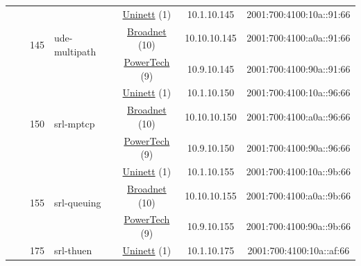 \begin{small}
\begin{center}
\begin{longtable}{|c|c|c|c|c|c|c|c|}
  &  & \multirow{3}{*}{\tiny{145}} & \multicolumn{1}{|l|}{\multirow{3}{*}{\tiny{ude-multipath}}} & \multicolumn{2}{|c|}{\tiny{\href{https://www.uninett.no}{Uninett} (1)}} & \tiny{10.1.10.145} & \tiny{2001:700:4100:10a::91:66} \\* \cline{5-5}\cline{6-6}\cline{7-7}\cline{8-8}
  &  &  &  & \multicolumn{2}{|c|}{\tiny{\href{https://www.broadnet.no}{Broadnet} (10)}} & \tiny{10.10.10.145} & \tiny{2001:700:4100:a0a::91:66} \\* \cline{5-5}\cline{6-6}\cline{7-7}\cline{8-8}
  &  &  &  & \multicolumn{2}{|c|}{\tiny{\href{http://www.powertech.no}{PowerTech} (9)}} & \tiny{10.9.10.145} & \tiny{2001:700:4100:90a::91:66} \\* \cline{3-3}\cline{4-4}\cline{5-5}\cline{6-6}\cline{7-7}\cline{8-8}
  &  & \multirow{3}{*}{\tiny{150}} & \multicolumn{1}{|l|}{\multirow{3}{*}{\tiny{srl-mptcp}}} & \multicolumn{2}{|c|}{\tiny{\href{https://www.uninett.no}{Uninett} (1)}} & \tiny{10.1.10.150} & \tiny{2001:700:4100:10a::96:66} \\* \cline{5-5}\cline{6-6}\cline{7-7}\cline{8-8}
  &  &  &  & \multicolumn{2}{|c|}{\tiny{\href{https://www.broadnet.no}{Broadnet} (10)}} & \tiny{10.10.10.150} & \tiny{2001:700:4100:a0a::96:66} \\* \cline{5-5}\cline{6-6}\cline{7-7}\cline{8-8}
  &  &  &  & \multicolumn{2}{|c|}{\tiny{\href{http://www.powertech.no}{PowerTech} (9)}} & \tiny{10.9.10.150} & \tiny{2001:700:4100:90a::96:66} \\* \cline{3-3}\cline{4-4}\cline{5-5}\cline{6-6}\cline{7-7}\cline{8-8}
  &  & \multirow{3}{*}{\tiny{155}} & \multicolumn{1}{|l|}{\multirow{3}{*}{\tiny{srl-queuing}}} & \multicolumn{2}{|c|}{\tiny{\href{https://www.uninett.no}{Uninett} (1)}} & \tiny{10.1.10.155} & \tiny{2001:700:4100:10a::9b:66} \\* \cline{5-5}\cline{6-6}\cline{7-7}\cline{8-8}
  &  &  &  & \multicolumn{2}{|c|}{\tiny{\href{https://www.broadnet.no}{Broadnet} (10)}} & \tiny{10.10.10.155} & \tiny{2001:700:4100:a0a::9b:66} \\* \cline{5-5}\cline{6-6}\cline{7-7}\cline{8-8}
  &  &  &  & \multicolumn{2}{|c|}{\tiny{\href{http://www.powertech.no}{PowerTech} (9)}} & \tiny{10.9.10.155} & \tiny{2001:700:4100:90a::9b:66} \\* \cline{3-3}\cline{4-4}\cline{5-5}\cline{6-6}\cline{7-7}\cline{8-8}
  &  & \multirow{3}{*}{\tiny{175}} & \multicolumn{1}{|l|}{\multirow{3}{*}{\tiny{srl-thuen}}} & \multicolumn{2}{|c|}{\tiny{\href{https://www.uninett.no}{Uninett} (1)}} & \tiny{10.1.10.175} & \tiny{2001:700:4100:10a::af:66} \\* \cline{5-5}\cline{6-6}\cline{7-7}\cline{8-8}

\end{longtable}
\end{center}
\end{small}
